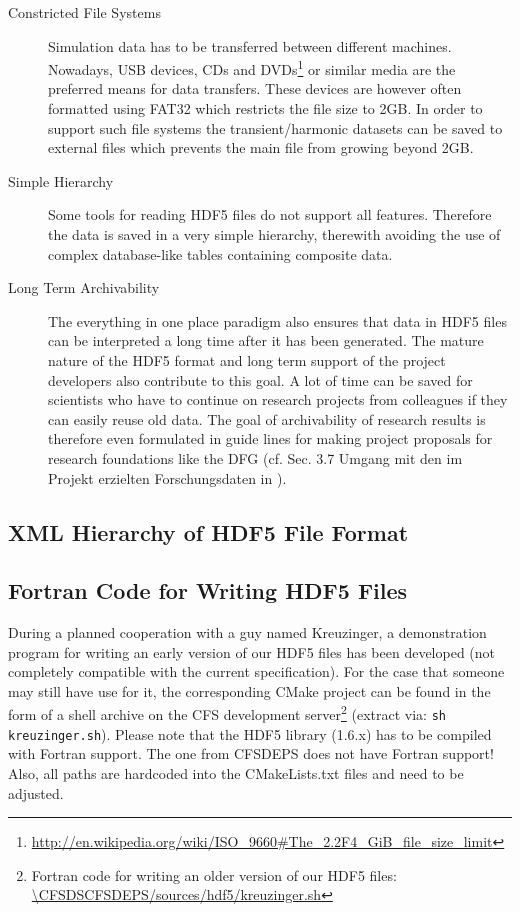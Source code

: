 \begin{description}
\item[Constricted File Systems] Simulation  data has to be transferred between
different      machines.      Nowadays,      USB     devices,      CDs     and
DVDs\footnote{\url{http://en.wikipedia.org/wiki/ISO\_9660\#The_2.2F4_GiB_file_size_limit}}
or similar  media are the preferred  means for data  transfers.  These devices
are however often formatted using FAT32  which restricts the file size to 2GB.
In order to  support such file systems the  transient/harmonic datasets can be
saved to external files which prevents the main file from growing beyond 2GB.

\item[Simple Hierarchy] Some  tools for reading HDF5 files  do not support all
features.  Therefore the  data is saved in a very simple  hierarchy, therewith
avoiding the use of complex database-like tables containing composite data.

\item[Long  Term Archivability]  The  everything in  one  place paradigm  also
ensures that data  in HDF5 files can  be interpreted a long time  after it has
been generated. The mature nature of  the HDF5 format and long term support of
the project  developers also  contribute to this  goal. A  lot of time  can be
saved for scientists who have to continue on research projects from colleagues
if  they can  easily reuse  old data.  The goal  of archivability  of research
results  is  therefore even  formulated  in  guide  lines for  making  project
proposals for research foundations like the  DFG (cf. Sec.  3.7 Umgang mit den
im Projekt erzielten Forschungsdaten in \cite{DFGGuidelines}).

\end{description}

\subsection{XML  Hierarchy  of  HDF5  File  Format}



\subsection{Fortran Code for Writing  HDF5 Files} During a planned cooperation
with a  guy named  Kreuzinger, a  demonstration program  for writing  an early
version of our  HDF5 files has been developed (not  completely compatible with
the current specification).  For the case  that someone may still have use for
it,  the corresponding  CMake project  can be  found in  the form  of a  shell
archive on  the CFS  development server\footnote{Fortran  code for  writing an
  older          version          of         our          HDF5          files:
  \url{\CFSDSCFSDEPS/sources/hdf5/kreuzinger.sh}}   (extract   via:  {\tt   sh
  kreuzinger.sh}).   Please note  that  the  HDF5 library  (1.6.x)  has to  be
compiled with  Fortran support.  The one  from CFSDEPS  does not  have Fortran
support!  Also, all paths are hardcoded into the CMakeLists.txt files and need
to be adjusted.

